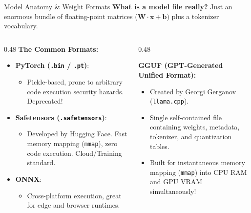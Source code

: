\documentclass[10pt,aspectratio=169]{beamer}
\begin{document}
\begin{frame}{Model Anatomy \& Weight Formats}
    \textbf{What is a model file really?} Just an enormous bundle of floating-point matrices ($\mathbf{W} \cdot \mathbf{x} + \mathbf{b}$) plus a tokenizer vocabulary.
    \vspace{0.2cm}
    \begin{columns}[T]
        \begin{column}{0.48\textwidth}
            \textbf{The Common Formats:}
            \begin{itemize}
                \item \textbf{PyTorch (\texttt{.bin} / \texttt{.pt})}:
                \begin{itemize}
                    \item Pickle-based, prone to arbitrary code execution security hazards. Deprecated!
                \end{itemize}
                \item \textbf{Safetensors (\texttt{.safetensors})}:
                \begin{itemize}
                    \item Developed by Hugging Face. Fast memory mapping (\texttt{mmap}), zero code execution. Cloud/Training standard.
                \end{itemize}
                \item \textbf{ONNX}:
                \begin{itemize}
                    \item Cross-platform execution, great for edge and browser runtimes.
                \end{itemize}
            \end{itemize}
        \end{column}
        \begin{column}{0.48\textwidth}
            \begin{tcolorbox}[colback=ShoeTeal!10, colframe=ShoeTeal, title=\textbf{The King of Local: GGUF}]
                \small
                \textbf{GGUF (GPT-Generated Unified Format):}
                \begin{itemize}
                    \item Created by Georgi Gerganov (\texttt{llama.cpp}).
                    \item Single self-contained file containing weights, metadata, tokenizer, and quantization tables.
                    \item Built for instantaneous memory mapping (\texttt{mmap}) into CPU RAM and GPU VRAM simultaneously!
                \end{itemize}
            \end{tcolorbox}
        \end{column}
    \end{columns}
\end{frame}
\end{document}
